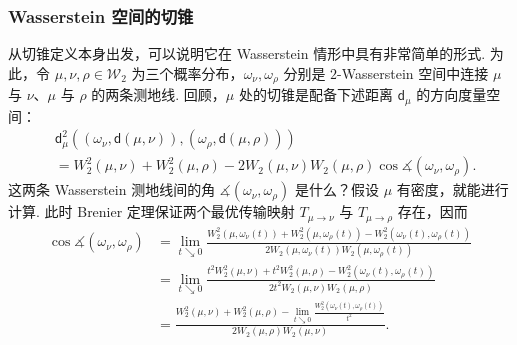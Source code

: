 \subsubsection{Wasserstein 空间的切锥}\label{sec:7.3.4}
从切锥定义本身出发，可以说明它在 Wasserstein 情形中具有非常简单的形式. 为此，令 $\mu,\nu,\rho\in\mathcal W_2$ 为三个概率分布，$\omega_\nu,\omega_\rho$ 分别是 $2$-Wasserstein 空间中连接 $\mu$ 与 $\nu$、$\mu$ 与 $\rho$ 的两条测地线. 回顾，$\mu$ 处的切锥是配备下述距离 $\mathsf d_\mu$ 的方向度量空间：
$$\begin{aligned}
&\mathsf d_\mu^2((\omega_\nu,\mathsf d(\mu,\nu)),(\omega_\rho,\mathsf d(\mu,\rho)))\\
&=W_2^2(\mu,\nu)+W_2^2(\mu,\rho)-2W_2(\mu,\nu)W_2(\mu,\rho)\cos\measuredangle(\omega_\nu,\omega_\rho).
\end{aligned}$$
这两条 Wasserstein 测地线间的角 $\measuredangle(\omega_\nu,\omega_\rho)$ 是什么？假设 $\mu$ 有密度，就能进行计算. 此时 Brenier 定理保证两个最优传输映射 $T_{\mu\to\nu}$ 与 $T_{\mu\to\rho}$ 存在，因而
$$\begin{aligned}
\cos\measuredangle(\omega_\nu,\omega_\rho)
&=\lim_{t\searrow0}\frac{W_2^2(\mu,\omega_\nu(t))+W_2^2(\mu,\omega_\rho(t))-W_2^2(\omega_\nu(t),\omega_\rho(t))}{2W_2(\mu,\omega_\nu(t))W_2(\mu,\omega_\rho(t))}\\
&=\lim_{t\searrow0}\frac{t^2W_2^2(\mu,\nu)+t^2W_2^2(\mu,\rho)-W_2^2(\omega_\nu(t),\omega_\rho(t))}{2t^2W_2(\mu,\nu)W_2(\mu,\rho)}\\
&=\frac{W_2^2(\mu,\nu)+W_2^2(\mu,\rho)-\lim_{t\searrow0}\frac{W_2^2(\omega_\nu(t),\omega_\rho(t))}{t^2}}{2W_2(\mu,\rho)W_2(\mu,\nu)}.
\end{aligned}$$

